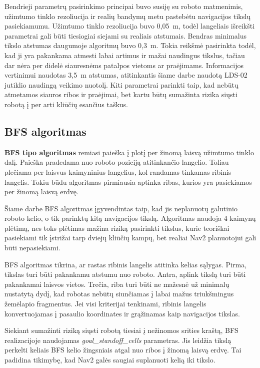 \documentclass[]{VUMIFTemplateClass}
\begin{document}
Bendrieji parametrų pasirinkimo principai buvo susiję su roboto matmenimis, užimtumo tinklo rezoliucija ir realių bandymų metu pastebėtu navigacijos tikslų
pasiekiamumu. Užimtumo tinklo rezoliucija buvo 0,05~m, todėl langeliais išreikšti parametrai gali būti tiesiogiai siejami su realiais atstumais. Bendras
minimalus tikslo atstumas daugumoje algoritmų buvo 0,3~m. Tokia reikšmė pasirinkta todėl, kad ji yra pakankama atmesti labai artimus ir mažai naudingus tikslus,
tačiau dar nėra per didelė siauresnėms patalpos vietoms ar praėjimams. Informacijos vertinimui naudotas 3,5~m atstumas, atitinkantis šiame darbe naudotą LDS-02
jutiklio naudingą veikimo nuotolį. Kiti parametrai parinkti taip, kad nebūtų atmetamos siauros ribos ir praėjimai, bet kartu būtų sumažinta rizika siųsti
robotą į per arti kliūčių esančius taškus.

\subsection{BFS algoritmas}

\textbf{BFS tipo algoritmas} remiasi paieška į plotį per žinomą laisvą užimtumo tinklo dalį. Paieška pradedama nuo roboto poziciją atitinkančio
langelio. Toliau plečiama per laisvus kaimyninius langelius, kol randamas tinkamas ribinis langelis. Tokiu būdu algoritmas pirmiausia aptinka ribas, kurios
yra pasiekiamos per žinomą laisvą erdvę.

Šiame darbe BFS algoritmas įgyvendintas taip, kad jis neplanuotų galutinio roboto kelio, o tik parinktų kitą navigacijos tikslą. Algoritmas naudoja 4 kaimynų plėtimą, nes toks plėtimas mažina riziką pasirinkti tikslus, kurie teoriškai pasiekiami tik įstrižai
tarp dviejų kliūčių kampų, bet realiai Nav2 planuotojui gali būti nepasiekiami.

BFS algoritmas tikrina, ar rastas ribinis langelis atitinka kelias sąlygas. Pirma, tikslas turi būti pakankamu atstumu nuo roboto. Antra, aplink tikslą turi
būti pakankamai laisvos vietos. Trečia, riba turi būti ne mažesnė už minimalų nustatytą dydį, kad robotas nebūtų siunčiamas į labai mažus triukšmingus
žemėlapio fragmentus. Jei visi kriterijai tenkinami, ribinis langelis konvertuojamas į pasaulio koordinates ir grąžinamas kaip navigacijos tikslas.

Siekiant sumažinti riziką siųsti robotą tiesiai į nežinomos srities kraštą, BFS realizacijoje naudojamas \textit{goal\_standoff\_cells} parametras. Jis
leidžia tikslą perkelti keliais BFS kelio žingsniais atgal nuo ribos į žinomą laisvą erdvę. Tai padidina tikimybę, kad Nav2 galės saugiai suplanuoti kelią iki
tikslo.
\end{document}

